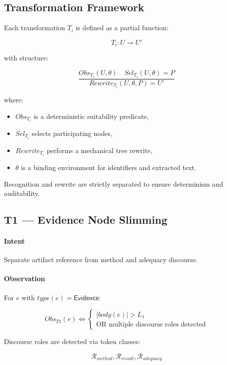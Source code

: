 \documentclass[12pt,twoside,a4paper]{article}
\begin{document}
\subsection{Transformation Framework}

Each transformation $T_i$ is defined as a partial function:

\[
T_i : U \rightharpoonup U'
\]

with structure:

\[
\frac{Obs_{T_i}(U,\theta) \quad Sel_{T_i}(U,\theta) = P}
     {Rewrite_{T_i}(U,\theta,P) = U'}
\]

where:

\begin{itemize}
  \item $Obs_{T_i}$ is a deterministic suitability predicate,
  \item $Sel_{T_i}$ selects participating nodes,
  \item $Rewrite_{T_i}$ performs a mechanical tree rewrite,
  \item $\theta$ is a binding environment for identifiers and extracted text.
\end{itemize}

Recognition and rewrite are strictly separated to ensure determinism and auditability.

\subsection{T1 --- Evidence Node Slimming}

\paragraph{Intent}
Separate artifact reference from method and adequacy discourse.

\paragraph{Observation}

For $e$ with $type(e)=\mathsf{Evidence}$:

\[
Obs_{T1}(e) \iff
\begin{cases}
|body(e)| > L_1 \\
\text{OR multiple discourse roles detected}
\end{cases}
\]

Discourse roles are detected via token classes:

\[
\mathcal{R}_{method}, \mathcal{R}_{result}, \mathcal{R}_{adequacy}
\]
\end{document}
